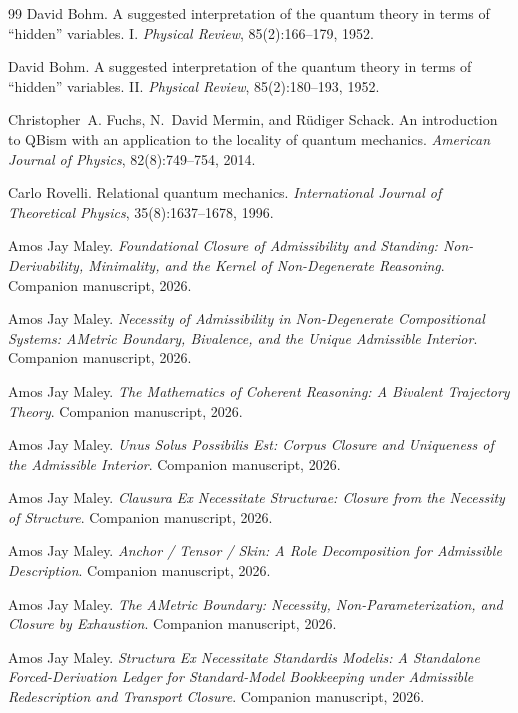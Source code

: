 \begin{thebibliography}{99}
David Bohm.
\newblock A suggested interpretation of the quantum theory in terms of ``hidden'' variables. {I}.
\newblock \emph{Physical Review}, 85(2):166--179, 1952.

David Bohm.
\newblock A suggested interpretation of the quantum theory in terms of ``hidden'' variables. {II}.
\newblock \emph{Physical Review}, 85(2):180--193, 1952.

Christopher~A. Fuchs, N.~David Mermin, and R{\"u}diger Schack.
\newblock An introduction to {QBism} with an application to the locality of quantum mechanics.
\newblock \emph{American Journal of Physics}, 82(8):749--754, 2014.

Carlo Rovelli.
\newblock Relational quantum mechanics.
\newblock \emph{International Journal of Theoretical Physics}, 35(8):1637--1678, 1996.

Amos Jay Maley.
\newblock \emph{Foundational Closure of Admissibility and Standing: Non-Derivability, Minimality, and the Kernel of Non-Degenerate Reasoning}.
\newblock Companion manuscript, 2026.

Amos Jay Maley.
\newblock \emph{Necessity of Admissibility in Non-Degenerate Compositional Systems: AMetric Boundary, Bivalence, and the Unique Admissible Interior}.
\newblock Companion manuscript, 2026.

Amos Jay Maley.
\newblock \emph{The Mathematics of Coherent Reasoning: A Bivalent Trajectory Theory}.
\newblock Companion manuscript, 2026.

Amos Jay Maley.
\newblock \emph{Unus Solus Possibilis Est: Corpus Closure and Uniqueness of the Admissible Interior}.
\newblock Companion manuscript, 2026.

Amos Jay Maley.
\newblock \emph{Clausura Ex Necessitate Structurae: Closure from the Necessity of Structure}.
\newblock Companion manuscript, 2026.

Amos Jay Maley.
\newblock \emph{Anchor / Tensor / Skin: A Role Decomposition for Admissible Description}.
\newblock Companion manuscript, 2026.

Amos Jay Maley.
\newblock \emph{The AMetric Boundary: Necessity, Non-Parameterization, and Closure by Exhaustion}.
\newblock Companion manuscript, 2026.

Amos Jay Maley.
\newblock \emph{Structura Ex Necessitate Standardis Modelis: A Standalone Forced-Derivation Ledger for Standard-Model Bookkeeping under Admissible Redescription and Transport Closure}.
\newblock Companion manuscript, 2026.

\end{thebibliography}

